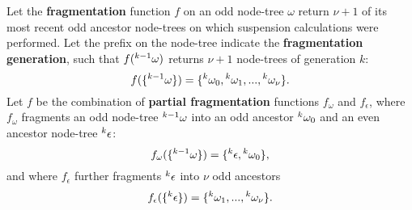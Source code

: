 
\begin{definition}\label{def:fragmentation}
  Let the \textbf{fragmentation} function $f$ on an odd node-tree $\omega$ return $\nu + 1$ of its most recent odd ancestor node-trees on which suspension calculations were performed. Let the prefix on the node-tree indicate the \textbf{fragmentation generation}, such that $f({}^{k-1}\omega)$ returns $\nu + 1$ node-trees of generation $k$:
  \begin{equation}\label{eq:fstep}
    f(\{\pre{k-1}\omega\}) = \{\pre{k}\omega_0,\pre{k}\omega_1,...,\pre{k}\omega_{\nu}\}.
  \end{equation}
  Let $f$ be the combination of \textbf{partial fragmentation} functions $f_\omega$ and $f_\epsilon$, where $f_\omega$ fragments an odd node-tree ${}^{k-1}\omega$ into an odd ancestor ${}^{k}\omega_0$ and an even ancestor node-tree ${}^{k}\epsilon$: 
  \begin{equation}\label{eq:pfo}
    f_\omega(\{\pre{k-1}\omega\}) = \{\pre{k}\epsilon, \pre{k}\omega_0 \},
  \end{equation}
  and where $f_\epsilon$ further fragments ${}^{k}\epsilon$ into $\nu$ odd ancestors
  \begin{equation}\label{eq:pfe}
    f_\epsilon(\{\pre{k}\epsilon\}) =\{\pre{k}\omega_1,...,\pre{k}\omega_{\nu}\}.
  \end{equation}

\end{definition}

